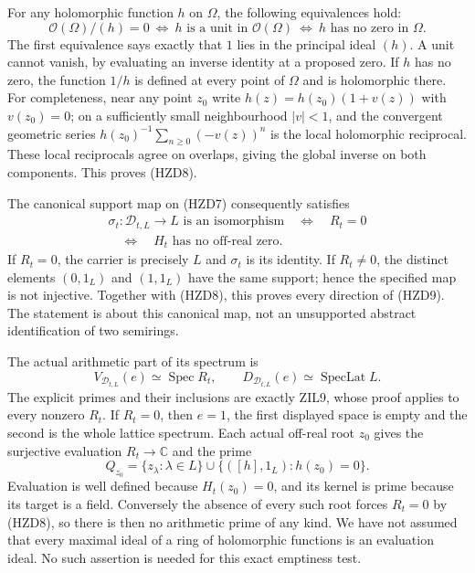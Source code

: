 For any holomorphic function $h$ on $\Omega$, the following
equivalences hold:
\begin{equation}\tag{HZD8}
 \mathcal O(\Omega)/(h)=0
 \ \Longleftrightarrow\ h\text{ is a unit in }\mathcal O(\Omega)
 \ \Longleftrightarrow\ h\text{ has no zero in }\Omega.
\end{equation}
The first equivalence says exactly that $1$ lies in the principal
ideal $(h)$. A unit cannot vanish, by evaluating an inverse identity
at a proposed zero. If $h$ has no zero, the function $1/h$ is defined
at every point of $\Omega$ and is holomorphic there. For completeness,
near any point $z_0$ write $h(z)=h(z_0)(1+v(z))$ with $v(z_0)=0$;
on a sufficiently small neighbourhood $|v|<1$, and the convergent
geometric series $h(z_0)^{-1}\sum_{n\ge0}(-v(z))^n$ is the local
holomorphic reciprocal. These local reciprocals agree on overlaps,
giving the global inverse on both components. This proves (HZD8).

The canonical support map on (HZD7) consequently satisfies
\begin{equation}\tag{HZD9}
\begin{gathered}
 \sigma_t:\mathscr D_{t,L}\longrightarrow L\text{ is an isomorphism}
 \quad\Longleftrightarrow\quad R_t=0\\
 \quad\Longleftrightarrow\quad
 H_t\text{ has no off-real zero}.
\end{gathered}
\end{equation}
If $R_t=0$, the carrier is precisely $L$ and $\sigma_t$ is its
identity. If $R_t\ne0$, the distinct elements $(0,1_L)$ and
$(1,1_L)$ have the same support; hence the specified map is not
injective. Together with (HZD8), this proves every direction of
(HZD9). The statement is about this canonical map, not an
unsupported abstract identification of two semirings.

The actual arithmetic part of its spectrum is
\begin{equation}\tag{HZD10}
 V_{\mathscr D_{t,L}}(e)\simeq\operatorname{Spec}R_t,
 \qquad
 D_{\mathscr D_{t,L}}(e)\simeq\operatorname{SpecLat}L.
\end{equation}
The explicit primes and their inclusions are exactly ZIL9, whose
proof applies to every nonzero $R_t$. If $R_t=0$, then $e=1$,
the first displayed space is empty and the second is the whole
lattice spectrum. Each actual off-real root $z_0$ gives the
surjective evaluation $R_t\to\mathbb C$ and the prime
\begin{equation}\tag{HZD11}
 Q_{z_0}=\{z_\lambda:\lambda\in L\}
       \cup\{([h],1_L):h(z_0)=0\}.
\end{equation}
Evaluation is well defined because $H_t(z_0)=0$, and its kernel
is prime because its target is a field. Conversely the absence
of every such root forces $R_t=0$ by (HZD8), so there is then
no arithmetic prime of any kind. We have not assumed that every
maximal ideal of a ring of holomorphic functions is an evaluation
ideal. No such assertion is needed for this exact emptiness test.

